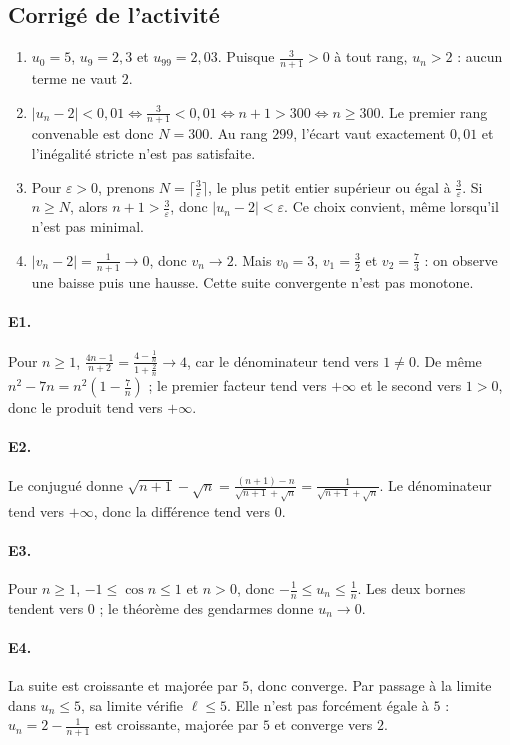 \subsection{Corrigé de l'activité}\begin{enumerate}
\item $u_0=5$, $u_9=2{,}3$ et $u_{99}=2{,}03$. Puisque $\frac{3}{n+1}>0$ à tout rang, $u_n>2$ : aucun terme ne vaut $2$.
\item $|u_n-2|<0{,}01\Longleftrightarrow \frac{3}{n+1}<0{,}01\Longleftrightarrow n+1>300\Longleftrightarrow n\ge300$. Le premier rang convenable est donc $N=300$. Au rang $299$, l'écart vaut exactement $0{,}01$ et l'inégalité stricte n'est pas satisfaite.
\item Pour $\varepsilon>0$, prenons $N=\lceil\frac{3}{\varepsilon}\rceil$, le plus petit entier supérieur ou égal à $\frac{3}{\varepsilon}$. Si $n\ge N$, alors $n+1>\frac{3}{\varepsilon}$, donc $|u_n-2|<\varepsilon$. Ce choix convient, même lorsqu'il n'est pas minimal.
\item $|v_n-2|=\frac{1}{n+1}\to0$, donc $v_n\to2$. Mais $v_0=3$, $v_1=\frac{3}{2}$ et $v_2=\frac{7}{3}$ : on observe une baisse puis une hausse. Cette suite convergente n'est pas monotone.
\end{enumerate}

\paragraph{E1.}Pour $n\ge1$, $\frac{4n-1}{n+2}=\frac{4-\frac{1}{n}}{1+\frac{2}{n}}\to4$, car le dénominateur tend vers $1\ne0$. De même $n^2-7n=n^2(1-\frac{7}{n})$ ; le premier facteur tend vers $+\infty$ et le second vers $1>0$, donc le produit tend vers $+\infty$.

\paragraph{E2.}Le conjugué donne $\sqrt{n+1}-\sqrt{n}=\frac{(n+1)-n}{\sqrt{n+1}+\sqrt n}=\frac{1}{\sqrt{n+1}+\sqrt n}$. Le dénominateur tend vers $+\infty$, donc la différence tend vers $0$.

\paragraph{E3.}Pour $n\ge1$, $-1\le\cos n\le1$ et $n>0$, donc $-\frac{1}{n}\le u_n\le\frac{1}{n}$. Les deux bornes tendent vers $0$ ; le théorème des gendarmes donne $u_n\to0$.

\paragraph{E4.}La suite est croissante et majorée par $5$, donc converge. Par passage à la limite dans $u_n\le5$, sa limite vérifie $\ell\le5$. Elle n'est pas forcément égale à $5$ : $u_n=2-\frac{1}{n+1}$ est croissante, majorée par $5$ et converge vers $2$.

